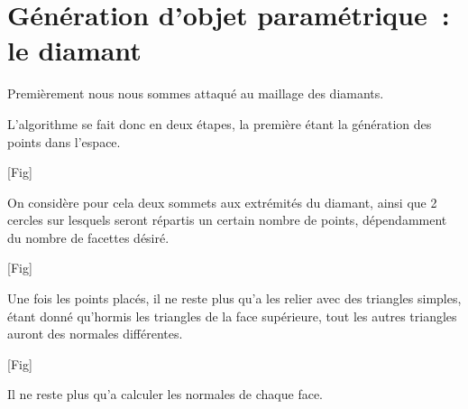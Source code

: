 \section{Génération d'objet paramétrique~: le diamant}

Premièrement nous nous sommes attaqué au maillage des diamants.

L'algorithme se fait donc en deux étapes, la première étant la génération des points dans l'espace.

[Fig]

On considère pour cela deux sommets aux extrémités du diamant, ainsi que 2 cercles sur lesquels
seront répartis un certain nombre de points, dépendamment du nombre de facettes désiré.

[Fig]

Une fois les points placés, il ne reste plus qu'a les relier avec des triangles simples, étant donné
qu'hormis les triangles de la face supérieure, tout les autres triangles auront des normales différentes.

[Fig]

Il ne reste plus qu'a calculer les normales de chaque face.

